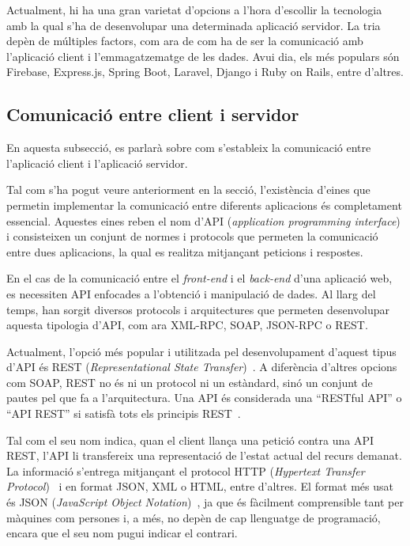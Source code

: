 \documentclass[a4paper,12pt]{ThesisStyle}
\begin{document}
Actualment, hi ha una gran varietat d'opcions a l'hora d'escollir la tecnologia amb la qual s'ha de desenvolupar una determinada aplicació servidor. La tria depèn de múltiples factors, com ara de com ha de ser la comunicació amb l'aplicació client i l'emmagatzematge de les dades. Avui dia, els més populars són Firebase, Express.js, Spring Boot, Laravel, Django i Ruby on Rails, entre d'altres.

\subsection{Comunicació entre client i servidor}

En aquesta subsecció, es parlarà sobre com s'estableix la comunicació entre l'aplicació client i l'aplicació servidor.

Tal com s'ha pogut veure anteriorment en la secció, l'existència d'eines que permetin implementar la comunicació entre diferents aplicacions és completament essencial. Aquestes eines reben el nom d'API (\textit{application programming interface}) i consisteixen un conjunt de normes i protocols que permeten la comunicació entre dues aplicacions, la qual es realitza mitjançant peticions i respostes.

En el cas de la comunicació entre el \textit{front-end} i el \textit{back-end} d'una aplicació web, es necessiten API enfocades a l'obtenció i manipulació de dades. Al llarg del temps, han sorgit diversos protocols i arquitectures que permeten desenvolupar aquesta tipologia d'API, com ara XML-RPC, SOAP, JSON-RPC o REST.

Actualment, l'opció més popular i utilitzada pel desenvolupament d'aquest tipus d'API és REST (\textit{Representational State Transfer})~\cite{REST}. A diferència d'altres opcions com SOAP, REST no és ni un protocol ni un estàndard, sinó un conjunt de pautes pel que fa a l'arquitectura. Una API és considerada una ``RESTful API'' o ``API REST'' si satisfà tots els principis REST~\cite{REST_CONSTRAINTS}.

Tal com el seu nom indica, quan el client llança una petició contra una API REST, l'API li transfereix una representació de l'estat actual del recurs demanat. La informació s'entrega mitjançant el protocol HTTP (\textit{Hypertext Transfer Protocol})~\cite{HTTP} i en format JSON, XML o HTML, entre d'altres. El format més usat és JSON (\textit{JavaScript Object Notation})~\cite{JSON}, ja que és fàcilment comprensible tant per màquines com persones i, a més, no depèn de cap llenguatge de programació, encara que el seu nom pugui indicar el contrari.
\end{document}
